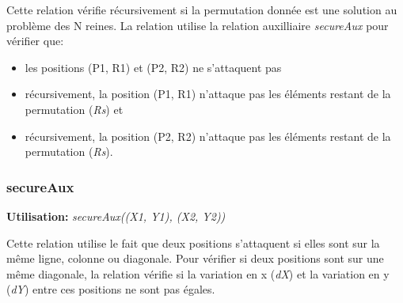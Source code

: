 \documentclass[10pt]{article}
\newcommand{\usage}[1]{\textbf{Utilisation: }\emph{#1}}
\begin{document}
Cette relation vérifie récursivement si la permutation donnée est une solution au problème des N reines. La relation utilise la relation auxilliaire \emph{secureAux} pour vérifier que:
\begin{itemize}
\item les positions (P1, R1) et (P2, R2) ne s'attaquent pas
\item récursivement, la position (P1, R1) n'attaque pas les éléments restant de la permutation (\emph{Rs}) et
\item récursivement, la position (P2, R2) n'attaque pas les éléments restant de la permutation (\emph{Rs}).
\end{itemize}

\subsubsection{secureAux}
\usage{secureAux((X1, Y1), (X2, Y2))}

Cette relation utilise le fait que deux positions s'attaquent si elles sont sur la même ligne, colonne ou diagonale. Pour vérifier si deux positions sont sur une même diagonale, la relation vérifie si la variation en x (\emph{dX}) et la variation en y (\emph{dY}) entre ces positions ne sont pas égales.
\end{document}
